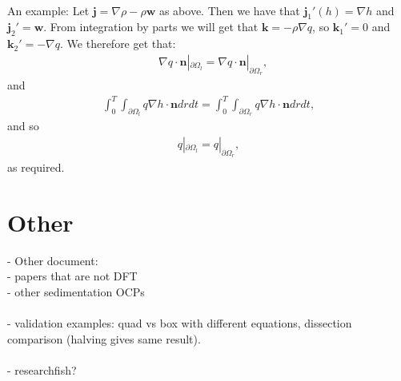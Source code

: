 \documentclass[11pt, a4paper]{article}
\theoremstyle{definition}
\newcommand{\w}{\mathbf{w}}
\newcommand{\n}{\mathbf{n}}
\newcommand{\jf}{\mathbf j}
\begin{document}
\\
An example: Let $\jf = \nabla \rho - \rho \w$ as above. Then we have that $\jf_1'(h) = \nabla h$ and $\jf_2' = \w $. From integration by parts we will get that $\mathbf k = - \rho \nabla q$, so $\mathbf k_1' = 0$ and $\mathbf k_2' = -  \nabla q$.
We therefore get that:
\begin{align*}
	& \nabla q \cdot \n |_{\partial \Omega_l} = \nabla q \cdot \n |_{\partial \Omega_r},
\end{align*}
and
\begin{align*}
	\int_0^T \int_{\partial \Omega_l}  q \nabla h   \cdot \n    dr dt = \int_0^T \int_{\partial \Omega_r} q \nabla h  \cdot \n    dr dt,
\end{align*}
and so 
\begin{align*}
	q |_{\partial \Omega_l} = q|_{\partial \Omega_r},
\end{align*}
as required.	



\section{Other}
- Other document:\\
- papers that are not DFT\\
- other sedimentation OCPs\\
\\
- validation examples: quad vs box with different equations, dissection comparison (halving gives same result).\\
\\
- researchfish?
\end{document}
